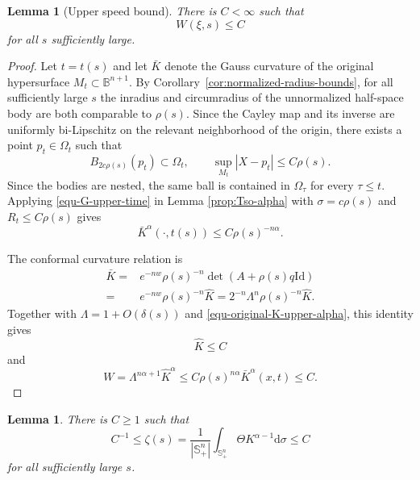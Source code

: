 \documentclass[11pt, reqno]{amsart}
\newtheorem{lemma}[theorem]{Lemma}
\theoremstyle{remark}
\theoremstyle{definition}
\numberwithin{equation}{section}
\newcommand{\B}{\mathbb B}
\begin{document}
\begin{lemma}[Upper speed bound]\label{prop:F-upper-alpha}
There is $C<\infty$ such that
\begin{equation}\label{eq:F-upper-alpha}
        W(\xi,s)\le C
\end{equation}
for all $s$ sufficiently large.
\end{lemma}

\begin{proof}
    Let $t=t(s)$ and let $\bar{K}$ denote the Gauss curvature of the original hypersurface $M_t\subset\B^{n+1}$.  By Corollary~\ref{cor:normalized-radius-bounds}, for all sufficiently large $s$ the inradius and
circumradius of the unnormalized half-space body are both comparable
to $\rho(s)$. Since the Cayley map and its inverse are uniformly
bi-Lipschitz on the relevant neighborhood of the origin, there exists
a point $p_t\in\Omega_t$ such that
\begin{equation*}
    B_{2c\rho(s)}(p_t)\subset\Omega_t,
    \qquad
    \sup_{M_t}|X-p_t|\le C\rho(s).
\end{equation*}
Since the bodies are nested, the same ball is contained in
$\Omega_\tau$ for every $\tau\le t$. Applying
\eqref{equ-G-upper-time} in Lemma \ref{prop:Tso-alpha} with
$\sigma=c\rho(s)$ and $R_t\le C\rho(s)$ gives
\begin{equation}\label{equ-original-K-upper-alpha}
    \bar K^\alpha(\cdot,t(s))
    \le C\rho(s)^{-n\alpha}.
\end{equation}
    
    The conformal curvature relation is
    \begin{align*}
        \bar{K} = &e^{-nw} \rho(s)^{-n}\det(A+\rho(s)q \mathrm{Id}) \\
        = &e^{-nw}\rho(s)^{-n} \widehat K = 2^{-n}\Lambda^n\rho(s)^{-n}\widehat{K}.
    \end{align*}
    Together with $\Lambda=1+O(\delta(s))$ and \eqref{equ-original-K-upper-alpha}, this identity gives
    \begin{equation}
        \label{equ-wideKupper}
        \widehat{K} \leq C
    \end{equation}
    and
    \begin{equation*}
        W=\Lambda^{n\alpha+1}\widehat K^\alpha \leq C\rho(s)^{n\alpha}\bar{K}^\alpha(x,t) \leq C.
    \end{equation*}
\end{proof}



\begin{lemma}\label{lem:Lambda-bounds-alpha}
There is $C\ge1$ such that
\begin{equation}\label{eq:Lambda-bounds-alpha}
        C^{-1}\le \zeta(s)= \dfrac{1}{|\mathbb{S}_+^n|}\int_{\mathbb{S}_+^n} \Theta K^{\alpha-1}\mathrm{d}\sigma  \le C
\end{equation}
for all sufficiently large $s$.
\end{lemma}
\end{document}
